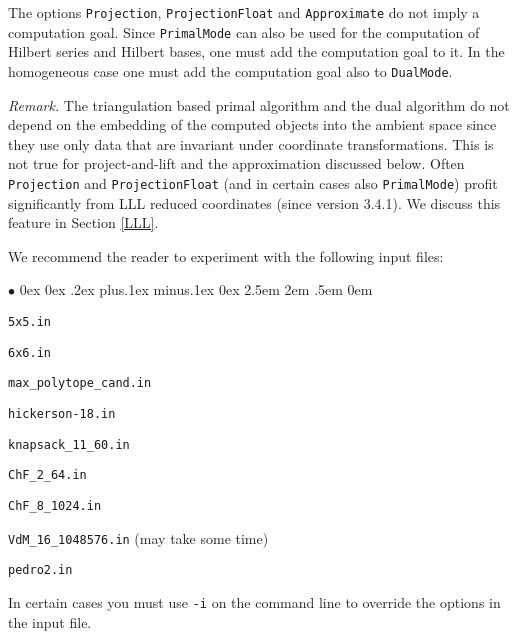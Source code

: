 \documentclass[12pt,a4paper]{scrartcl}
\newcommand{\stdli}{ \topsep0ex \partopsep0ex %
\parsep.2ex plus.1ex minus.1ex \itemsep0ex%
\leftmargin2.5em \labelwidth2em \labelsep.5em \rightmargin0em}%
\renewenvironment{itemize}{\begin{list}{{$\bullet$}}{\stdli}}{\end{list}}
\theoremstyle{definition}
\begin{document}
The options \verb|Projection|, \verb|ProjectionFloat| and \verb|Approximate| do not imply a computation goal. Since \verb|PrimalMode| can also be used for the computation of Hilbert series and Hilbert bases, one must add the computation goal to it. In the homogeneous case one must add the computation goal also to \verb|DualMode|.

\emph{Remark.}\enspace
The triangulation based primal algorithm and the dual algorithm do not depend on the embedding of the computed objects into the ambient space since they use only data that are invariant under coordinate transformations. This is not true for project-and-lift and the approximation discussed below. Often \verb|Projection| and \verb|ProjectionFloat| (and in certain cases also  \verb|PrimalMode|) profit significantly from LLL reduced coordinates (since version 3.4.1). We discuss this feature in Section \ref{LLL}. 

We recommend the reader to experiment with the following input files:
\begin{itemize}
	\item \verb|5x5.in|
	\item \verb|6x6.in|
	\item \verb|max_polytope_cand.in|
	\item \verb|hickerson-18.in|
	\item \verb|knapsack_11_60.in|
	\item \verb|ChF_2_64.in|
	\item \verb|ChF_8_1024.in|
	\item \verb|VdM_16_1048576.in| (may take some time)
	\item \verb|pedro2.in|
\end{itemize}

In certain cases you must use \verb|-i| on the command line to override the options in the input file.
\end{document}
